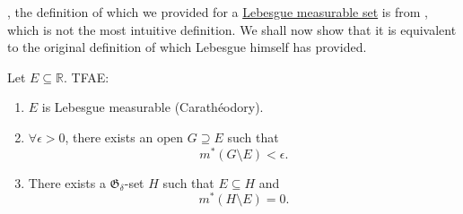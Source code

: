 \documentclass[notoc,notitlepage]{tufte-book}
\begin{document}
, the definition of which we provided for a
\hyperref[defn:lebesgue_measureable_set]{Lebesgue measurable set} is from
, which is not the most intuitive definition. We shall
now show that it is equivalent to the original definition of which Lebesgue
himself has provided.

\begin{thm}\label{thm:carath'_e_odory_s_and_lebesgue_s_definition_of_measurability}
  Let $E \subseteq \mathbb{R}$. TFAE:
  \begin{enumerate}
    \item $E$ is Lebesgue measurable (Carath\'{e}odory).
    \item $\forall \epsilon > 0$, there exists an open $G \supseteq E$
      such that
      \begin{equation*}
        m^* (G \setminus E) < \epsilon.
      \end{equation*}
    \item There exists a $\mathfrak{G}_{\delta}$-set $H$ such that $E \subseteq
      H$ and
      \begin{equation*}
        m^* ( H \setminus E ) = 0.
      \end{equation*}
  \end{enumerate}
\end{thm}
\end{document}
